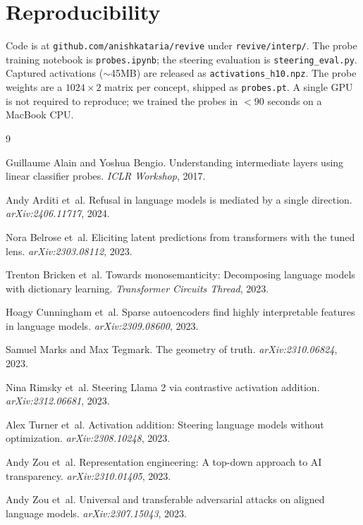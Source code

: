 \documentclass[11pt]{article}
\begin{document}
\section{Reproducibility}

Code is at \texttt{github.com/anishkataria/revive} under \texttt{revive/interp/}. The probe training notebook is \texttt{probes.ipynb}; the steering evaluation is \texttt{steering\_eval.py}. Captured activations ($\sim$45MB) are released as \texttt{activations\_h10.npz}. The probe weights are a $1024{\times}2$ matrix per concept, shipped as \texttt{probes.pt}. A single GPU is not required to reproduce; we trained the probes in $<90$ seconds on a MacBook CPU.


\begin{thebibliography}{9}

Guillaume Alain and Yoshua Bengio.
Understanding intermediate layers using linear classifier probes.
\emph{ICLR Workshop}, 2017.

Andy Arditi et~al.
Refusal in language models is mediated by a single direction.
\emph{arXiv:2406.11717}, 2024.

Nora Belrose et~al.
Eliciting latent predictions from transformers with the tuned lens.
\emph{arXiv:2303.08112}, 2023.

Trenton Bricken et~al.
Towards monosemanticity: Decomposing language models with dictionary learning.
\emph{Transformer Circuits Thread}, 2023.

Hoagy Cunningham et~al.
Sparse autoencoders find highly interpretable features in language models.
\emph{arXiv:2309.08600}, 2023.

Samuel Marks and Max Tegmark.
The geometry of truth.
\emph{arXiv:2310.06824}, 2023.

Nina Rimsky et~al.
Steering Llama 2 via contrastive activation addition.
\emph{arXiv:2312.06681}, 2023.

Alex Turner et~al.
Activation addition: Steering language models without optimization.
\emph{arXiv:2308.10248}, 2023.

Andy Zou et~al.
Representation engineering: A top-down approach to AI transparency.
\emph{arXiv:2310.01405}, 2023.

Andy Zou et~al.
Universal and transferable adversarial attacks on aligned language models.
\emph{arXiv:2307.15043}, 2023.

\end{thebibliography}
\end{document}
